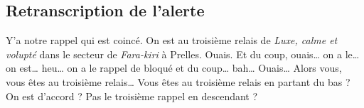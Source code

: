 \subsection{Retranscription de l'alerte}
\begin{dialogue}
  \Req {} Y'a notre rappel qui est coincé. On est au troisième relais de \emph{Luxe, calme et volupté} dans le secteur de \emph{Fara-kiri} à Prelles.
  \Sec Ouais.
  \Req Et du coup, ouais… on a le… on est… heu… on a le rappel de bloqué et du coup… bah…
  \Sec Ouais… Alors vous, vous êtes au troisième relais… Vous êtes au troisième relais en partant du bas ? On est d'accord ? Pas le troisième rappel en descendant ? 
\end{dialogue}

